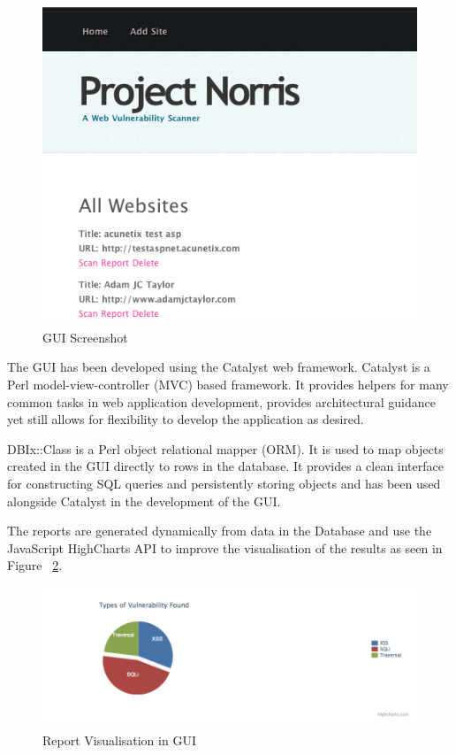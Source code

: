 \documentclass[12pt,a4paper]{article}
\begin{document}
\begin{figure}[!ht]
    \begin{center}
        \includegraphics[scale=0.4]{images/gui.png}    
    \end{center}
    \caption{GUI Screenshot}
    \label{fig:gui}
\end{figure}


The GUI has been developed using the Catalyst web framework.  Catalyst is a Perl model-view-controller (MVC) based framework.  It provides helpers for many common tasks in web application development, provides architectural guidance yet still allows for flexibility to develop the application as desired.

DBIx::Class is a Perl object relational mapper (ORM).  It is used to map objects created in the GUI directly to rows in the database.  It provides a clean interface for constructing SQL queries and persistently storing objects and has been used alongside Catalyst in the development of the GUI.

The reports are generated dynamically from data in the Database and use the JavaScript HighCharts API to improve the visualisation of the results as seen in Figure ~\ref{fig:report}.

\begin{figure}[!ht]
    \begin{center}
        \includegraphics[scale=0.4]{images/report.png}    
    \end{center}
    \caption{Report Visualisation in GUI}
    \label{fig:report}
\end{figure}
\end{document}
